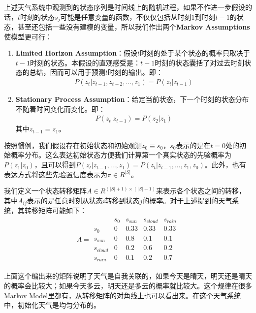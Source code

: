 上述天气系统中观测到的状态序列是时间线上的随机过程，如果不作进一步假设的话，$t$时刻的状态$s_j$可能是任意变量的函数，不仅仅包括从时刻$1$到时刻$t-1$的状态，甚至还包括一些没有建模的变量，所以我们作出两个{\bf Markov Assumptions}使模型更可行：
\begin{enumerate}
  \item {\bf Limited Horizon Assumption}：假设$t$时刻的处于某个状态的概率只取决于$t-1$时刻的状态。本假设的直观感受是：$t-1$时刻的状态囊括了对过去时刻状态的总结，因而可以用于预测$t$时刻的输出。即：
    \begin{align}
      \label{eqn:lha}
      P(z_t|z_{t-1}, z_{t-2}, ..., z_1) = P(z_t|z_{t-1})
    \end{align}
  \item {\bf Stationary Process Assumption}：给定当前状态，下一个时刻的状态分布不随着时间变化而变化。即：
    \begin{align}
      \label{eqn:spa}
      P(z_t|z_{t-1}) = P(z_2|z_1)
    \end{align}
    其中$z_{t-1}=z_1$。
\end{enumerate}

按照惯例，我们假设存在初始状态和初始观测$z_0\equiv s_0$，$s_0$表示的是在$t=0$处的初始概率分布。这么表达初始状态方便我们计算第一个真实状态的先验概率为$P(z_1|z_0)$，且可以得到$P(z_t|z_{t-1},...,z_1)=P(z_t|z_{t-1},...,z_1,z_0)$。此外，也有表达方式将这些先验置信度表示为$\pi \in R^{|S|}$。

我们定义一个状态转移矩阵$A\in{R^{(|S|+1)\times(|S|+1)}}$来表示各个状态之间的转移，其中$A_{ij}$表示的是任意时刻从状态$i$转移到状态$j$的概率。对于上述提到的天气系统，其转移矩阵可能如下：
\begin{align}
A = 
\begin{matrix}
            & s_0   &  s_{sun} & s_{cloud}  & s_{rain} \\
 s_0        & 0     &  0.33    & 0.33       & 0.33      \\
 s_{sun}    & 0     &  0.8     & 0.1        & 0.1       \\
 s_{cloud}  & 0     &  0.2     & 0.6        & 0.2      \\
 s_{rain}   & 0     &  0.1     & 0.2        & 0.7      
\end{matrix}
\end{align}

上面这个编出来的矩阵说明了天气是自我关联的，如果今天是晴天，明天还是晴天的概率会比较大；如果今天多云，明天还是多云的概率就比较大。这个规律在很多Markov Model里都有，从转移矩阵的对角线上也可以看出来。在这个天气系统中，初始化天气是均匀分布的。

